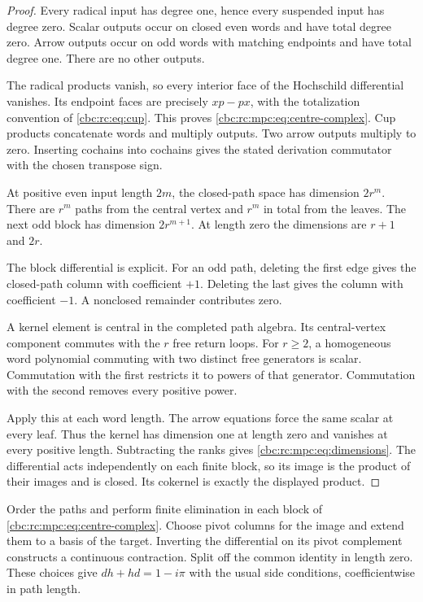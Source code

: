 \begin{proof}
Every radical input has degree one, hence every suspended input
has degree zero.  Scalar outputs occur on closed even words and
have total degree zero.  Arrow outputs occur on odd words with
matching endpoints and have total degree one.  There are no other
outputs.

The radical products vanish, so every interior face of
the Hochschild differential vanishes.  Its endpoint faces are
precisely \(xp-px\), with the totalization convention of
\eqref{cbc:rc:eq:cup}.  This proves \eqref{cbc:rc:mpc:eq:centre-complex}.
Cup products concatenate words and multiply outputs. Two arrow
outputs multiply to zero.  Inserting cochains into cochains gives
the stated derivation commutator with the chosen transpose sign.

At positive even input length \(2m\), the closed-path space has
dimension \(2r^m\). There are \(r^m\) paths from the central vertex and
\(r^m\) in total from the leaves.  The next odd block has dimension
\(2r^{m+1}\).  At length zero the dimensions are \(r+1\) and \(2r\).

The block differential is explicit.  For an odd path, deleting the first edge gives the closed-path column
with coefficient \(+1\). Deleting the last gives the column with
coefficient \(-1\).  A nonclosed remainder contributes zero.

A kernel element is central in the completed path algebra.  Its
central-vertex component commutes with the \(r\) free return loops.
For \(r\geq2\), a homogeneous word polynomial commuting with two
distinct free generators is scalar. Commutation with the first
restricts it to powers of that generator. Commutation with
the second removes every positive power.

Apply this at each word
length.  The arrow equations force the same scalar at every leaf.
Thus the kernel has dimension one at length zero and vanishes at
every positive length.  Subtracting the ranks gives
\eqref{cbc:rc:mpc:eq:dimensions}.  The differential acts independently on
each finite block, so its image is the product of their images
and is closed.  Its cokernel is exactly the displayed product.
\end{proof}

Order the paths and perform finite elimination in each block of
\eqref{cbc:rc:mpc:eq:centre-complex}. Choose pivot columns for the image
and extend them to a basis of the target. Inverting the differential
on its pivot complement constructs a continuous contraction.
Split off the common identity in length zero.  These choices give
\(dh+hd=1-i\pi\) with the usual side conditions, coefficientwise
in path length.

